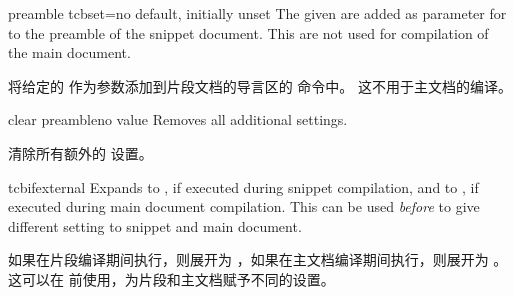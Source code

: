 \begin{extTcbKey}[][doc new=2015-05-05]{preamble tcbset}{=}{no default,
initially unset}
The given  are added as parameter for 
to the preamble of the snippet document.
This are not used for compilation of the main document.

将给定的  作为参数添加到片段文档的导言区的  命令中。
这不用于主文档的编译。
\end{extTcbKey}


\begin{extTcbKey}[][doc new=2015-03-16]{clear preamble}{}{no value}
Removes all additional  settings.

清除所有额外的  设置。
\end{extTcbKey}



\begin{docCommand}[doc new=2015-03-11]{tcbifexternal}{}
Expands to , if executed during snippet compilation,
and to , if executed during main document compilation.
This can be used \emph{before}  to
give different setting to snippet and main document.

如果在片段编译期间执行，则展开为 ，如果在主文档编译期间执行，则展开为 。
这可以在  前使用，为片段和主文档赋予不同的设置。
\begin{dispListing}
\tcbifexternal{
  \usepackage{onlyforexternal}
}{
  \usepackage{onlyformain}
}
\end{dispListing}
\end{docCommand}


